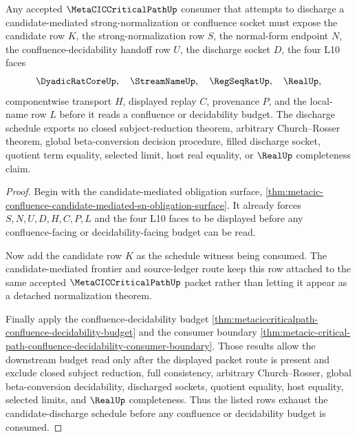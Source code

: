 \begin{theorem}
\label{thm:metacic-critical-path-candidate-discharge-schedule-exhaustion}
Any accepted $\MetaCICCriticalPathUp$ consumer that attempts to discharge a candidate-mediated strong-normalization or confluence socket must expose the candidate row $K$, the strong-normalization row $S$, the normal-form endpoint $N$, the confluence-decidability handoff row $U$, the discharge socket $D$, the four L10 faces
$$
\DyadicRatCoreUp,\quad \StreamNameUp,\quad \RegSeqRatUp,\quad \RealUp,
$$
componentwise transport $H$, displayed replay $C$, provenance $P$, and the local-name row $L$ before it reads a confluence or decidability budget. The discharge schedule exports no closed subject-reduction theorem, arbitrary Church--Rosser theorem, global beta-conversion decision procedure, filled discharge socket, quotient term equality, selected limit, host real equality, or $\RealUp$ completeness claim.
\end{theorem}
\begin{proof}
Begin with the candidate-mediated obligation surface, \autoref{thm:metacic-confluence-candidate-mediated-sn-obligation-surface}. It already forces $S,N,U,D,H,C,P,L$ and the four L10 faces to be displayed before any confluence-facing or decidability-facing budget can be read.

Now add the candidate row $K$ as the schedule witness being consumed. The candidate-mediated frontier and source-ledger route keep this row attached to the same accepted $\MetaCICCriticalPathUp$ packet rather than letting it appear as a detached normalization theorem.

Finally apply the confluence-decidability budget \autoref{thm:metaciccriticalpath-confluence-decidability-budget} and the consumer boundary \autoref{thm:metacic-critical-path-confluence-decidability-consumer-boundary}. Those results allow the downstream budget read only after the displayed packet route is present and exclude closed subject reduction, full consistency, arbitrary Church--Rosser, global beta-conversion decidability, discharged sockets, quotient equality, host equality, selected limits, and $\RealUp$ completeness. Thus the listed rows exhaust the candidate-discharge schedule before any confluence or decidability budget is consumed.
\end{proof}

